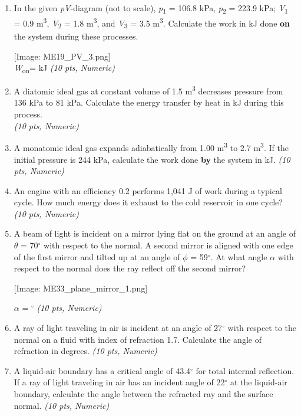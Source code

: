 \documentclass[11pt]{article}
\begin{document}
\begin{enumerate}[leftmargin=*]
  \item In the given \emph{pV}-diagram (not to scale), \emph{p}\textsubscript{1} = 106.8 kPa, \emph{p}\textsubscript{2} = 223.9 kPa; \emph{V}\textsubscript{1} = 0.9 m\textsuperscript{3}, \emph{V}\textsubscript{2} = 1.8 m\textsuperscript{3}, and \emph{V}\textsubscript{3} = 3.5 m\textsuperscript{3}. Calculate the work in kJ done \textbf{on} the system during these processes.

[Image: ME19\_PV\_3.png] \\

\emph{W}\textsubscript{on}\emph{}= kJ \hfill \textit{(10 pts, Numeric)}

  \item A diatomic ideal gas at constant volume of 1.5 m\textsuperscript{3} decreases pressure from 136 kPa to 81 kPa. Calculate the energy transfer by heat in kJ during this process. \\ \hfill \textit{(10 pts, Numeric)}

  \item A monatomic ideal gas expands adiabatically from 1.00 m\textsuperscript{3} to 2.7 m\textsuperscript{3}. If the initial pressure is 244 kPa, calculate the work done \textbf{by} the system in kJ. \hfill \textit{(10 pts, Numeric)}

  \item An engine with an efficiency 0.2 performs 1,041 J of work during a typical cycle. How much energy does it exhaust to the cold reservoir in one cycle? \hfill \textit{(10 pts, Numeric)}

  \item A beam of light is incident on a mirror lying flat on the ground at an angle of $\theta$ = 70$^{\circ}$ with respect to the normal. A second mirror is aligned with one edge of the first mirror and tilted up at an angle of $\phi$ = 59$^{\circ}$. At what angle $\alpha$ with respect to the normal does the ray reflect off the second mirror?

[Image: ME33\_plane\_mirror\_1.png]

$\alpha$ = $^{\circ}$ \hfill \textit{(10 pts, Numeric)}

  \item A ray of light traveling in air is incident at an angle of 27$^{\circ}$ with respect to the normal on a fluid with index of refraction 1.7. Calculate the angle of refraction in degrees. \hfill \textit{(10 pts, Numeric)}

  \item A liquid-air boundary has a critical angle of 43.4$^{\circ}$ for total internal reflection. If a ray of light traveling in air has an incident angle of 22$^{\circ}$ at the liquid-air boundary, calculate the angle between the refracted ray and the surface normal. \hfill \textit{(10 pts, Numeric)}


\end{enumerate}
\end{document}
